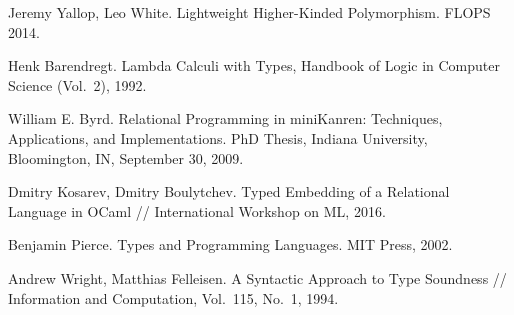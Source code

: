 \documentclass{llncs}
\begin{document}
\begin{thebibliography}{99}

Jeremy Yallop, Leo White. Lightweight Higher-Kinded Polymorphism. FLOPS 2014.

Henk Barendregt. Lambda Calculi with Types, Handbook of Logic in Computer Science (Vol.~2), 1992.

William E. Byrd. Relational Programming in miniKanren: Techniques, Applications, and Implementations. PhD Thesis,
Indiana University, Bloomington, IN, September 30, 2009.

Dmitry Kosarev, Dmitry Boulytchev. Typed Embedding of a Relational Language in OCaml // International Workshop on ML, 2016.

Benjamin Pierce. Types and Programming Languages. MIT Press, 2002.

Andrew Wright, Matthias Felleisen. A Syntactic Approach to Type Soundness // Information and Computation, Vol.~115, No.~1, 1994.
\end{thebibliography}
\end{document}
